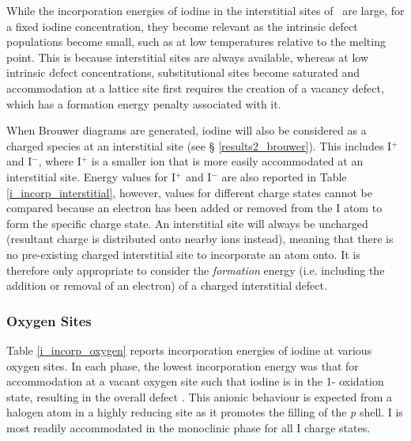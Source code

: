 While the incorporation energies of iodine in the interstitial sites of \zirconia\ are large, for a fixed iodine concentration, they become relevant as the intrinsic defect populations become small, such as at low temperatures relative to the melting point. This is because interstitial sites are always available, whereas at low intrinsic defect concentrations, substitutional sites become saturated and accommodation at a lattice site first requires the creation of a vacancy defect, which has a formation energy penalty associated with it. 

When Brouwer diagrams are generated, iodine will also be considered as a charged species at an interstitial site (see § \ref{results2_brouwer}). This includes I$^{+}$ and I$^{-}$, where I$^{+}$ is a smaller ion that is more easily accommodated at an interstitial site. Energy values for I$^{+}$ and I$^{-}$ are also reported in Table \ref{i_incorp_interstitial}, however, values for different charge states cannot be compared because an electron has been added or removed from the I atom to form the specific charge state. An interstitial site will always be uncharged (resultant charge is distributed onto nearby ions instead), meaning that there is no pre-existing charged interstitial site to incorporate an atom onto. It is therefore only appropriate to consider the \emph{formation} energy (i.e. including the addition or removal of an electron) of a charged interstitial defect. 

\subsubsection*{Oxygen Sites}

Table \ref{i_incorp_oxygen} reports incorporation energies of iodine at various oxygen sites. In each phase, the lowest incorporation energy was that for accommodation at a vacant oxygen site such that iodine is in the 1- oxidation state, resulting in the overall defect . This anionic behaviour is expected from a halogen atom in a highly reducing site as it promotes the filling of the \emph{p} shell. I is most readily accommodated in the monoclinic phase for all I charge states.

